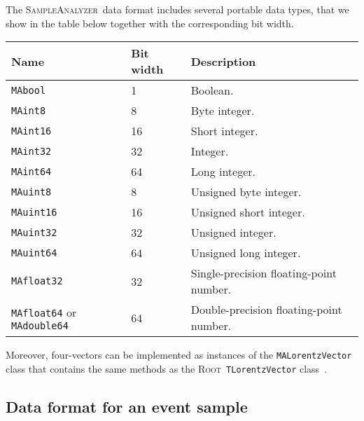 \documentclass[a4paper]{article}
\newcommand{\ROOT}{\textsc{Root}}
\newcommand{\spla}{\textsc{SampleAnalyzer}}
\begin{document}
\noindent The \spla\ data format includes several portable data types, that we
show in the table below together with the corresponding bit width.
\renewcommand{\arraystretch}{1.1}%
\begin{center}\begin{tabular}{l l p{8.0cm}}
\hline
Name & Bit width & Description\\
\hline
\color{ao} \verb?MAbool?    & 1  & Boolean.\\
\hline
\color{ao}\verb?MAint8?    & 8  & Byte integer.\\
\color{ao}\verb?MAint16?   & 16 & Short integer.\\
\color{ao}\verb?MAint32?   & 32 & Integer.\\
\color{ao}\verb?MAint64?   & 64 & Long integer.\\
\hline
\color{ao}\verb?MAuint8?   & 8  & Unsigned byte integer.\\
\color{ao}\verb?MAuint16?  & 16 & Unsigned short integer.\\
\color{ao}\verb?MAuint32?  & 32 & Unsigned integer.\\
\color{ao}\verb?MAuint64?  & 64 & Unsigned long integer.\\
\hline
\color{ao} \verb?MAfloat32? & 32 & Single-precision floating-point number.\\
{\color{ao} \verb?MAfloat64?} or {\color{ao} \verb?MAdouble64?}  & 64 & Double-precision
   floating-point number.\\
\hline
\end{tabular}
\end{center}
Moreover, four-vectors can be implemented as instances of the
{\color{ao}\verb+MALorentzVector+} class that contains the same methods as the \ROOT\
{\color{ao}\verb+TLorentzVector+} class~\cite{Brun:1997pa}.

\vspace{2cm}

\begin{shaded}
\section{\Large Data format for an event sample}
\end{shaded}
\end{document}
